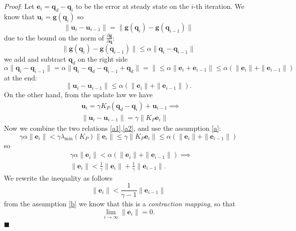 \documentclass[10pt, a4paper]{report}
\newcommand{\q}{{\mathbf q}}
\begin{document}
\noindent\textit{Proof}: Let $\mathbf e_i=\q_d-\q_i$ to be the error at steady state on the $i$-th iteration.  We know that $ \mathbf u_i=\mathbf g(\q_i)$ so\begin{equation}
    \|\mathbf u_i-\mathbf u_{i-1}\|=
    \|\mathbf g(\q_i)-\mathbf g(\q_{i-1})\|
\end{equation}
due to the bound on the norm of $\frac{\partial \mathbf g}{\partial \q}$:\begin{equation}
    \|\mathbf g(\q_i)-\mathbf g(\q_{i-1})\|\le \alpha\|\q_i-\q_{i-1}\|
\end{equation}
we add and subtract $\q_d$ on the right side\begin{equation}
     \alpha\|\q_i-\q_{i-1}\|= \alpha\|\q_i-\q_d-\q_{i-1}+\q_d\|=
     \|\le\alpha\|\mathbf e_i+\mathbf e_{i-1}\|\le
     \alpha(\|\mathbf e_i\|+\|\mathbf e_{i-1}\|)
\end{equation}
at the end:\begin{equation}\label{a1}
     \|\mathbf u_i-\mathbf u_{i-1}\|\le  \alpha(\|\mathbf e_i\|+\|\mathbf e_{i-1}\|).
\end{equation}
On the other hand, from the update law we have\begin{align}
     &\mathbf u_i=\gamma K_P(\q_d-\q_i)+\mathbf u_{i-1}\implies\\ 
     &\|\mathbf u_i-\mathbf u_{i-1}\|=\gamma\|K_P\mathbf e_i\|\label{a2}
\end{align}
Now we combine the two relations \eqref{a1},\eqref{a2}, and use the assumption \eqref{a}:\begin{equation}
   \gamma\alpha\|\mathbf e_i\| < \gamma\lambda_{\text{min}}(K_P)\|\mathbf e_i\| \le \gamma\|K_P\mathbf e_i\|\le \alpha(\|\mathbf e_i\|+\|\mathbf e_{i-1}\|)
\end{equation}
so\begin{align}
    &\gamma\alpha\|\mathbf e_i\| <\alpha(\|\mathbf e_i\|+\|\mathbf e_{i-1}\|)\implies \\ 
    &\|\mathbf e_i\|<\frac{1}{\gamma}\|\mathbf e_i\|+\frac{1}{\gamma}\|\mathbf e_{i-1}\|.
\end{align}
We rewrite the inequality as follows\begin{equation}
    \|\mathbf e_i\|<\frac{1}{\gamma-1}\|\mathbf e_{i-1}\|
\end{equation}
from the assumption \eqref{b} we know that this is a \textit{contraction mapping}, so that\begin{equation}
    \lim_{i\rightarrow\infty}\|\mathbf e_i\|=0.
\end{equation}
\hfill$\blacksquare$\bigskip 
\end{document}
